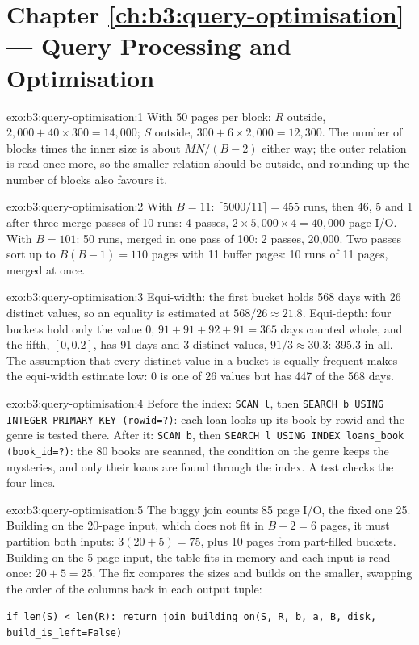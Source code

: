 \section*{Chapter \ref{ch:b3:query-optimisation} --- Query Processing and Optimisation}

\begin{solution}{exo:b3:query-optimisation:1}
With 50 pages per block: $R$ outside, $2{,}000 + 40 \times 300 = 14{,}000$; $S$ outside, $300 + 6 \times 2{,}000 = 12{,}300$. The number of blocks times the inner size is about $MN/(B-2)$ either way; the outer relation is read once more, so the smaller relation should be outside, and rounding up the number of blocks also favours it.
\end{solution}

\begin{solution}{exo:b3:query-optimisation:2}
With $B = 11$: $\lceil 5000/11 \rceil = 455$ runs, then 46, 5 and 1 after three merge passes of 10 runs: 4 passes, $2 \times 5{,}000 \times 4 = 40{,}000$ page I/O. With $B = 101$: 50 runs, merged in one pass of 100: 2 passes, 20,000. Two passes sort up to $B(B-1) = 110$ pages with 11 buffer pages: 10 runs of 11 pages, merged at once.
\end{solution}

\begin{solution}{exo:b3:query-optimisation:3}
Equi-width: the first bucket holds 568 days with 26 distinct values, so an equality is estimated at $568/26 \approx 21.8$. Equi-depth: four buckets hold only the value 0, $91 + 91 + 92 + 91 = 365$ days counted whole, and the fifth, $[0, 0.2]$, has 91 days and 3 distinct values, $91/3 \approx 30.3$: 395.3 in all. The assumption that every distinct value in a bucket is equally frequent makes the equi-width estimate low: 0 is one of 26 values but has 447 of the 568 days.
\end{solution}

\begin{solution}{exo:b3:query-optimisation:4}
Before the index: \texttt{SCAN l}, then \texttt{SEARCH b USING INTEGER PRIMARY KEY (rowid=?)}: each loan looks up its book by rowid and the genre is tested there. After it: \texttt{SCAN b}, then \texttt{SEARCH l USING INDEX loans\_book (book\_id=?)}: the 80 books are scanned, the condition on the genre keeps the mysteries, and only their loans are found through the index. A test checks the four lines.
\end{solution}

\begin{solution}{exo:b3:query-optimisation:5}
The buggy join counts 85 page I/O, the fixed one 25. Building on the 20-page input, which does not fit in $B - 2 = 6$ pages, it must partition both inputs: $3(20 + 5) = 75$, plus 10 pages from part-filled buckets. Building on the 5-page input, the table fits in memory and each input is read once: $20 + 5 = 25$. The fix compares the sizes and builds on the smaller, swapping the order of the columns back in each output tuple:
\begin{center}
\texttt{if len(S) < len(R):\ return join\_building\_on(S, R, b, a, B, disk, build\_is\_left=False)}
\end{center}
\end{solution}

